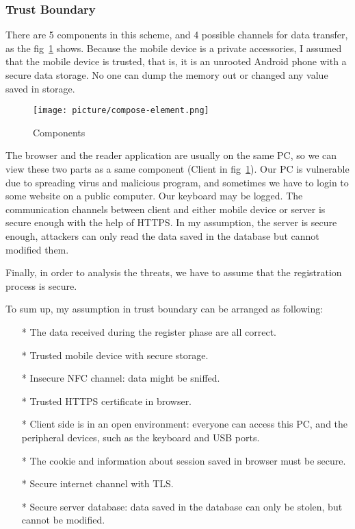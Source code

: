 \begin{CJK}{Bg5}{bsmi}
\subsubsection{Trust Boundary}

There are 5 components in this scheme, and 4 possible channels for data transfer, as the fig~\ref{fig:compose-element} shows. Because the mobile device is a private accessories, I assumed that the mobile device is trusted, that is, it is an unrooted Android phone with a secure data storage. No one can dump the memory out or changed any value saved in storage. 

\begin{figure}
\centering
\texttt{[image: picture/compose-element.png]}
\caption{Components}
\label{fig:compose-element}
\end{figure}

The browser and the reader application are usually on the same PC, so we can view these two parts as a same component (Client in fig~\ref{fig:compose-element}). Our PC is vulnerable due to spreading virus and malicious program, and sometimes we have to login to some website on a public computer. Our keyboard may be logged. The communication channels between client and either mobile device or server is secure enough with the help of HTTPS. In my assumption, the server is secure enough, attackers can only read the data saved in the database but cannot modified them.

Finally, in order to analysis the threats, we have to assume that the registration process is secure.

To sum up, my assumption in trust boundary can be arranged as following:
\begin{enumerate}
\item[*] The data received during the register phase are all correct.
\item[*] Trusted mobile device with secure storage.
\item[*] Insecure NFC channel: data might be sniffed.
\item[*] Trusted HTTPS certificate in browser.
\item[*] Client side is in an open environment: everyone can access this PC, and the peripheral devices, such as the keyboard and USB ports.
\item[*] The cookie and information about session saved in browser must be secure.
\item[*] Secure internet channel with TLS.
\item[*] Secure server database: data saved in the database can only be stolen, but cannot be modified.
\end{enumerate}


\end{CJK}
